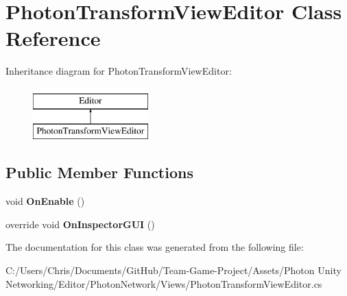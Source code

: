 \hypertarget{class_photon_transform_view_editor}{}\section{Photon\+Transform\+View\+Editor Class Reference}
\label{class_photon_transform_view_editor}
Inheritance diagram for Photon\+Transform\+View\+Editor\+:\begin{figure}[H]
\begin{center}
\leavevmode
\includegraphics[height=2.000000cm]{class_photon_transform_view_editor}
\end{center}
\end{figure}
\subsection*{Public Member Functions}
\begin{DoxyCompactItemize}
\item 
void {\bfseries On\+Enable} ()\hypertarget{class_photon_transform_view_editor_afe5f66904b0ded9661737d633d976d8c}{}\label{class_photon_transform_view_editor_afe5f66904b0ded9661737d633d976d8c}

\item 
override void {\bfseries On\+Inspector\+G\+UI} ()\hypertarget{class_photon_transform_view_editor_a2c9f8512545a3a004af03fd03829df20}{}\label{class_photon_transform_view_editor_a2c9f8512545a3a004af03fd03829df20}

\end{DoxyCompactItemize}


The documentation for this class was generated from the following file\+:\begin{DoxyCompactItemize}
\item 
C\+:/\+Users/\+Chris/\+Documents/\+Git\+Hub/\+Team-\/\+Game-\/\+Project/\+Assets/\+Photon Unity Networking/\+Editor/\+Photon\+Network/\+Views/Photon\+Transform\+View\+Editor.\+cs\end{DoxyCompactItemize}
